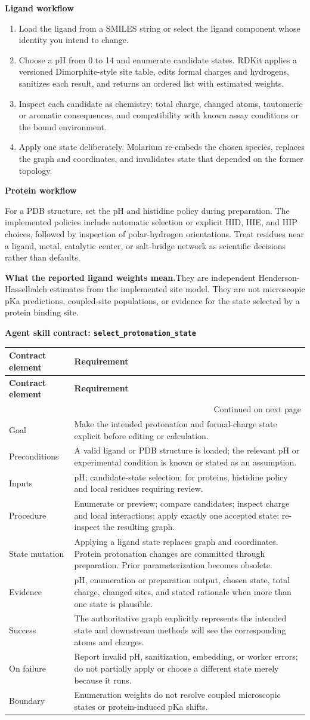 \documentclass[10pt,letterpaper]{article}
\makeatletter
\newcommand{\code}[1]{\texttt{#1}}
\newcommand{\lead}[1]{\textbf{#1}\hspace{0.35em}}
\newcommand{\subhead}[1]{%
  \par\needspace{2\baselineskip}\vspace{2.5pt}%
  {\fontsize{10.91}{13.1}\selectfont\bfseries #1}\par\vspace{-1.5pt}}
\newenvironment{skillcontract}[1]{%
  \par\needspace{5\baselineskip}\vspace{2pt}%
  {\fontsize{10.91}{13.1}\selectfont\bfseries Agent skill contract: \code{#1}}\par\vspace{1pt}%
  \fontsize{8.4}{10}\selectfont
  \begin{longtable}{@{}K V@{}}
  \toprule
  \textbf{Contract element} & \textbf{Requirement}\\
  \midrule
  \endfirsthead
  \toprule
  \textbf{Contract element} & \textbf{Requirement}\\
  \midrule
  \endhead
  \midrule
  \multicolumn{2}{r}{\footnotesize Continued on next page}\\
  \endfoot
  \bottomrule
  \endlastfoot
}{%
  \end{longtable}
  \normalsize\fontsize{9.96}{11.95}\selectfont}
\newcommand{\contractrow}[2]{#1 & #2\\}
\makeatother
\begin{document}
\subhead{Ligand workflow}

\begin{enumerate}
\item Load the ligand from a SMILES string or select the ligand component whose identity you intend to change.
\item Choose a pH from 0 to 14 and enumerate candidate states. RDKit applies a versioned Dimorphite-style site table, edits formal charges and hydrogens, sanitizes each result, and returns an ordered list with estimated weights.
\item Inspect each candidate as chemistry: total charge, changed atoms, tautomeric or aromatic consequences, and compatibility with known assay conditions or the bound environment.
\item Apply one state deliberately. Molarium re-embeds the chosen species, replaces the graph and coordinates, and invalidates state that depended on the former topology.
\end{enumerate}

\subhead{Protein workflow}

For a PDB structure, set the pH and histidine policy during preparation. The implemented policies include automatic selection or explicit HID, HIE, and HIP choices, followed by inspection of polar-hydrogen orientations. Treat residues near a ligand, metal, catalytic center, or salt-bridge network as scientific decisions rather than defaults.

\lead{What the reported ligand weights mean.}They are independent Henderson-Hasselbalch estimates from the implemented site model. They are not microscopic pKa predictions, coupled-site populations, or evidence for the state selected by a protein binding site.

\begin{skillcontract}{select\_protonation\_state}
\contractrow{Goal}{Make the intended protonation and formal-charge state explicit before editing or calculation.}
\contractrow{Preconditions}{A valid ligand or PDB structure is loaded; the relevant pH or experimental condition is known or stated as an assumption.}
\contractrow{Inputs}{pH; candidate-state selection; for proteins, histidine policy and local residues requiring review.}
\contractrow{Procedure}{Enumerate or preview; compare candidates; inspect charge and local interactions; apply exactly one accepted state; re-inspect the resulting graph.}
\contractrow{State mutation}{Applying a ligand state replaces graph and coordinates. Protein protonation changes are committed through preparation. Prior parameterization becomes obsolete.}
\contractrow{Evidence}{pH, enumeration or preparation output, chosen state, total charge, changed sites, and stated rationale when more than one state is plausible.}
\contractrow{Success}{The authoritative graph explicitly represents the intended state and downstream methods will see the corresponding atoms and charges.}
\contractrow{On failure}{Report invalid pH, sanitization, embedding, or worker errors; do not partially apply or choose a different state merely because it runs.}
\contractrow{Boundary}{Enumeration weights do not resolve coupled microscopic states or protein-induced pKa shifts.}
\end{skillcontract}
\end{document}
